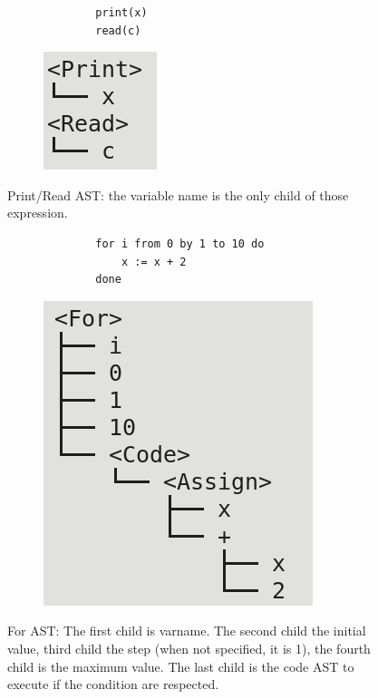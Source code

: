 \documentclass[letterpaper]{article}
\begin{document}
\begin{figure}[H]
    \begin{subfigure}{.5\textwidth}
        \begin{lstlisting}
        print(x)
        read(c)
        \end{lstlisting}
    \end{subfigure}
    \begin{subfigure}{.5\textwidth}
    \includegraphics[scale=0.5]{image/print-read.png}
\end{subfigure}
    \caption{Print/Read AST: the variable name is the only child of those
    expression.}
\end{figure}

\begin{figure}[H]
    \begin{subfigure}{.5\textwidth}
        \begin{lstlisting}
        for i from 0 by 1 to 10 do
            x := x + 2
        done
    \end{lstlisting}
    \end{subfigure}
    \begin{subfigure}{.5\textwidth}
    \includegraphics[scale=0.5]{image/for.png}
\end{subfigure}
    \caption{For AST: The first child is varname. The second child the
    initial value, third child the step (when not specified, it is 1),
    the fourth child is the maximum value. The last child is the code
    AST to execute if the condition are respected.}
\end{figure}
\end{document}
